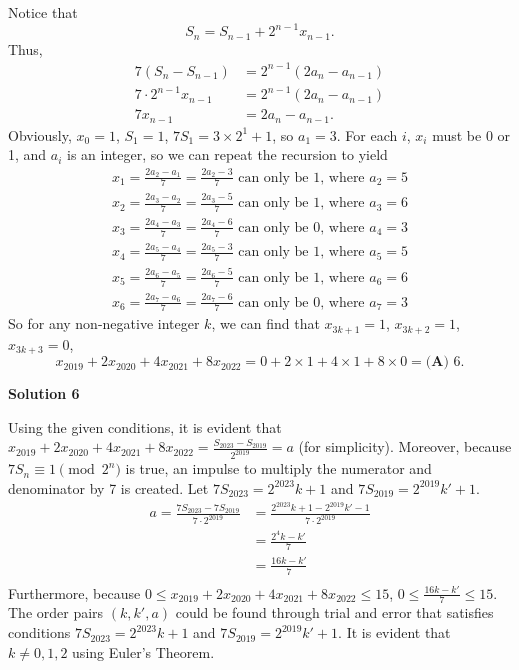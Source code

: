 \begin{enumerate}
 Notice that 
 \[S_n = S_{n-1} + 2^{n-1}x_{n-1}.\]Thus,
 \begin{align*} 7(S_n - S_{n-1}) &= 2^{n-1}(2a_n - a_{n-1})\\ 7 \cdot 2^{n - 1}x_{n - 1} &= 2^{n - 1}(2a_n - a_{n - 1})\\ 7x_{n-1} &= 2a_n - a_{n-1}. \end{align*}
Obviously, $x_0 = 1$, $S_1 = 1$, $7S_1 = 3 \times 2^1 + 1$, so $a_1 = 3$. For each $i$, $x_i$ must be 0 or 1, and $a_i$ is an integer, so we can repeat the recursion to yield
 \begin{align*} x_1 = \frac{2a_2 - a_1}{7} = \frac{2a_2 - 3}{7}\text{ can only be 1, where }a_2 = 5\\ x_2 = \frac{2a_3 - a_2}{7} = \frac{2a_3 - 5}{7}\text{ can only be 1, where }a_3 = 6\\ x_3 = \frac{2a_4 - a_3}{7} = \frac{2a_4 - 6}{7}\text{ can only be 0, where }a_4 = 3\\ x_4 = \frac{2a_5 - a_4}{7} = \frac{2a_5 - 3}{7}\text{ can only be 1, where }a_5 = 5\\ x_5 = \frac{2a_6 - a_5}{7} = \frac{2a_6 - 5}{7}\text{ can only be 1, where }a_6 = 6\\ x_6 = \frac{2a_7 - a_6}{7} = \frac{2a_7 - 6}{7}\text{ can only be 0, where }a_7 = 3 \end{align*}
So for any non-negative integer $k$,  we can find that $x_{3k + 1} = 1$, $x_{3k + 2} = 1$, $x_{3k + 3} = 0$, 
 \[x_{2019} + 2x_{2020} + 4x_{2021} + 8x_{2022} = 0 + 2 \times 1 + 4 \times 1 + 8 \times  0 = \boxed{\textbf{(A) } 6}.\]




\textbf{Solution 6}

Using the given conditions, it is evident that $x_{2019} + 2x_{2020} + 4x_{2021} + 8x_{2022}=\frac{S_{2023}-S_{2019}}{2^{2019}}=a$ (for simplicity). Moreover, because $7S_n \equiv 1 \pmod{2^n}$ is true, an impulse to multiply the numerator and denominator by 7 is created. Let $7S_{2023}=2^{2023}k+1$ and $7S_{2019}=2^{2019}k'+1$.\begin{align*}a=\frac{7S_{2023}-7S_{2019}}{7\cdot2^{2019}}&=\frac{2^{2023}k+1-2^{2019}k'-1}{7\cdot2^{2019}} \\&=\frac{2^4k-k'}{7} \\&=\frac{16k-k'}{7} \\\end{align*}
Furthermore, because $0\le x_{2019} + 2x_{2020} + 4x_{2021} + 8x_{2022}\le15$, $0\le\frac{16k-k'}{7}\le15$. The order pairs $(k,k',a)$ could be found through trial and error that satisfies conditions $7S_{2023}=2^{2023}k+1$ and $7S_{2019}=2^{2019}k'+1$. It is evident that $k\ne0,1,2$ using Euler's Theorem.


\end{enumerate}
